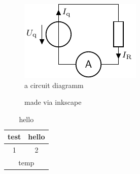 \documentclass[twoside,f1,ngerman]{HsH-report}
\begin{document}
	\begin{figure}
		\centering
		\includegraphics{crc/exampleCircuit.pdf}
		\caption{a circuit diagramm}
	\end{figure}

	\makeatletter

	\begin{figure}
		\graphicspath{{svg/}} %
		
		\caption{made via inkscape}
	\end{figure}

	\begin{table}
		\caption{hello}
		\begin{tabular}{c|c}
			test & hello \\\hline\hline
			1 & 2 \\
			\multicolumn{2}{|c|}{temp}
		\end{tabular}
	\end{table}

\printbibliography
\listoffigures
\end{document}
